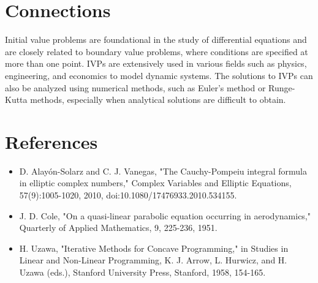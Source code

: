 \documentclass[11pt,a4paper]{article}
\begin{document}
\section{Connections}
Initial value problems are foundational in the study of differential equations and are closely related to boundary value problems, where conditions are specified at more than one point. IVPs are extensively used in various fields such as physics, engineering, and economics to model dynamic systems. The solutions to IVPs can also be analyzed using numerical methods, such as Euler's method or Runge-Kutta methods, especially when analytical solutions are difficult to obtain.

\section{References}
\begin{itemize}
    \item D. Alayón-Solarz and C. J. Vanegas, "The Cauchy-Pompeiu integral formula in elliptic complex numbers," Complex Variables and Elliptic Equations, 57(9):1005-1020, 2010, doi:10.1080/17476933.2010.534155.
    \item J. D. Cole, "On a quasi-linear parabolic equation occurring in aerodynamics," Quarterly of Applied Mathematics, 9, 225-236, 1951.
    \item H. Uzawa, "Iterative Methods for Concave Programming," in Studies in Linear and Non-Linear Programming, K. J. Arrow, L. Hurwicz, and H. Uzawa (eds.), Stanford University Press, Stanford, 1958, 154-165.
\end{itemize}
\end{document}
